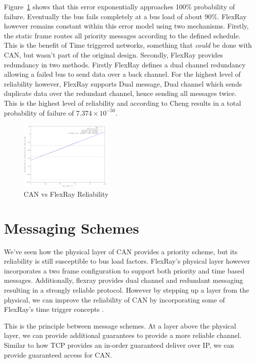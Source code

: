 \documentclass[conference,12pt]{IEEEtran}
\begin{document}
Figure~\ref{fig:can_vs_flexray_reliability} shows that this error
exponentially approaches 100\% probability of failure. Eventually the bus fails
completely at a 
bus load of about 90\%. FlexRay however remains constant within this error
model using two mechanisms. Firstly, the static frame routes all priority messages according
to the defined schedule. This is the benefit of Time triggered networks,
something that \emph{could} be done with CAN, but wasn't part of the original
design. Secondly, FlexRay provides redundancy in two methods. Firstly FlexRay
defines a dual channel redundancy allowing a failed bus to send data over a back
channel. For the highest level of reliability however, FlexRay supports Dual
message, Dual channel which sends duplicate data over the redundant channel,
hence sending all messages twice.  This is the highest level of reliability and
according to Cheng results in a total probability of failure of $7.374 \times
10^{-50}$.

\begin{figure}
  \centering
  \includegraphics[width=0.4\textwidth]{FlexRaySystemReliability.png}
  \caption{CAN vs FlexRay Reliability}
  \label{fig:can_vs_flexray_reliability}
\end{figure}


\section{Messaging Schemes}
We've seen how the physical layer of CAN provides a priority scheme, but its
reliability is still susceptible to bus load factors. FlexRay's physical layer
however incorporates a two frame configuration to support both priority and time
based messages. Additionally, flexray provides dual channel and redundant messaging
resulting in a strongly reliable protocol.  However by stepping up a layer from
the physical, we can improve the reliability of CAN by incorporating some of
FlexRay's time trigger concepts \autocite{steinbach_tomorrows_2012}. 

This is the principle between message schemes.
At a layer above the physical layer, we can provide additional guarantees to
provide a more reliable channel. Similar to how TCP provides an in-order
guaranteed deliver over IP, we can provide guaranteed access for CAN.
\end{document}
